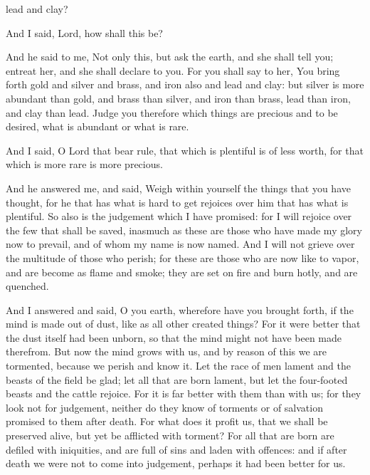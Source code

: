 {{} lead and clay?
\par }{\PP {}And I said, Lord, how shall this be?
\par }{\PP {}And he said to me, Not only this, but ask the earth, and she shall tell you; entreat her, and she shall declare to you.
For you shall say to her, You bring forth gold and silver and brass, and iron also and lead and clay:
but silver is more abundant than gold, and brass than silver, and iron than brass, lead than iron, and clay than lead.
Judge you therefore which things are precious and to be desired, what is abundant or what is rare.
\par }{\PP {}And I said, O Lord that bear rule, that which is plentiful is of less worth, for that which is more rare is more precious.
\par }{\PP {}And he answered me, and said,
 Weigh within yourself the things that you have thought, for he that has what is hard to get rejoices over him that has what is plentiful.
So also is the
 judgement which I have promised: for I will rejoice over the few that shall be saved, inasmuch as these are those who have made my glory now to prevail, and of whom my name is now named.
And I will not grieve over the multitude of those who perish; for these are those who are now like to vapor, and are become as flame and smoke; they are set on fire and burn hotly, and are quenched.
\par }{\PP {}And I answered and said, O you earth, wherefore have you brought forth, if the mind is made out of dust, like as all other created things?
For it were better that the dust itself had been unborn, so that the mind might not have been made therefrom.
But now the mind grows with us, and by reason of this we are tormented, because we perish and know it.
Let the race of men lament and the beasts of the field be glad; let all that are born lament, but let the four-footed beasts and the cattle rejoice.
For it is far better with them than with us; for they look not for judgement, neither do they know of torments or of salvation promised to them after death.
For what does it profit us, that we shall be preserved alive, but yet be afflicted with torment?
For all that are born are
 defiled with iniquities, and are full of sins and laden with offences:
and if after death we were not to come into judgement, perhaps it had been better for us.
}
